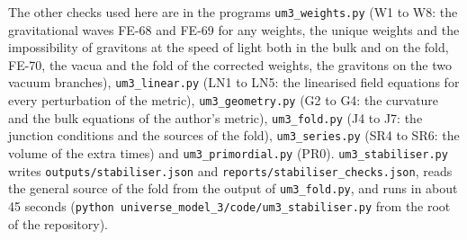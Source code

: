 \documentclass[
  10pt,
]{article}
\begin{document}
The other checks used here are in the programs \texttt{um3\_weights.py}
(W1 to W8: the gravitational waves FE-68 and FE-69 for any weights, the
unique weights and the impossibility of gravitons at the speed of light
both in the bulk and on the fold, FE-70, the vacua and the fold of the
corrected weights, the gravitons on the two vacuum branches),
\texttt{um3\_linear.py} (LN1 to LN5: the linearised field equations for
every perturbation of the metric), \texttt{um3\_geometry.py} (G2 to G4:
the curvature and the bulk equations of the author's metric),
\texttt{um3\_fold.py} (J4 to J7: the junction conditions and the sources
of the fold), \texttt{um3\_series.py} (SR4 to SR6: the volume of the
extra times) and \texttt{um3\_primordial.py} (PR0).
\texttt{um3\_stabiliser.py} writes \texttt{outputs/stabiliser.json} and
\texttt{reports/stabiliser\_checks.json}, reads the general source of
the fold from the output of \texttt{um3\_fold.py}, and runs in about 45
seconds (\texttt{python\ universe\_model\_3/code/um3\_stabiliser.py}
from the root of the repository).
\end{document}
